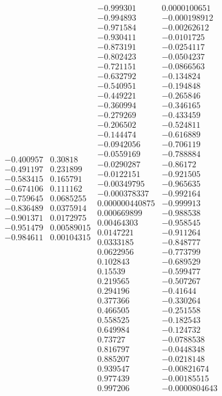 \documentclass[11pt]{article}
\theoremstyle{definition}
\begin{document}
$$\begin{array}{cc}
 -0.400957 & 0.30818 \\
 -0.491197 & 0.231899 \\
 -0.583415 & 0.165791 \\
 -0.674106 & 0.111162 \\
 -0.759645 & 0.0685255 \\
 -0.836489 & 0.0375914 \\
 -0.901371 & 0.0172975 \\
 -0.951479 & 0.00589015 \\
 -0.984611 & 0.00104315 
\end{array}
\begin{array}{cc}
 -0.999301 & 0.0000100651 \\
 -0.994893 & -0.000198912 \\
 -0.971584 & -0.00262612 \\
 -0.930411 & -0.0101725 \\
 -0.873191 & -0.0254117 \\
 -0.802423 & -0.0504237 \\
  -0.721151 & -0.0866563 \\
 -0.632792 & -0.134824 \\
 -0.540951 & -0.194848 \\
 -0.449221 & -0.265846 \\
 -0.360994 & -0.346165 \\
 -0.279269 & -0.433459 \\
 -0.206502 & -0.524811 \\
 -0.144474 & -0.616889 \\
 -0.0942056 & -0.706119 \\
 -0.0559169 & -0.788884 \\
 -0.0290287 & -0.86172 \\
 -0.0122151 & -0.921505 \\
 -0.00349795 & -0.965635 \\
 -0.000378337 & -0.992164 \\
 0.000000440875 & -0.999913 \\
 0.000669899 & -0.988538 \\
 0.00464303 & -0.958545 \\
 0.0147221 & -0.911264 \\
 0.0333185 & -0.848777 \\
 0.0622956 & -0.773799 \\
 0.102843 & -0.689529 \\
 0.15539 & -0.599477 \\
 0.219565 & -0.507267 \\
 0.294196 & -0.41644 \\
 0.377366 & -0.330264 \\
 0.466505 & -0.251558 \\
 0.558525 & -0.182543 \\
 0.649984 & -0.124732 \\
 0.73727 & -0.0788538 \\
 0.816797 & -0.0448348 \\
 0.885207 & -0.0218148 \\
 0.939547 & -0.00821674 \\
 0.977439 & -0.00185515 \\
 0.997206 & -0.0000804643
\end{array}
$$
\end{document}
